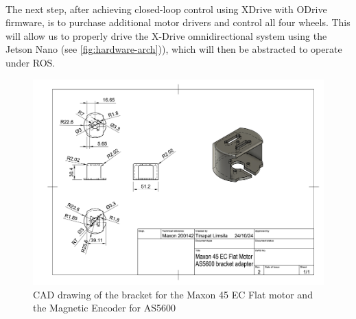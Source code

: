 \paragraph*{}
The next step, after achieving closed-loop control using XDrive with ODrive firmware, is to purchase additional motor drivers and control all four wheels. This will allow us to properly drive the X-Drive omnidirectional system using the Jetson Nano (see \ref{fig:hardware-arch})), which will then be abstracted to operate under ROS.
\begin{figure}
    \centering
    \includegraphics[width=1\linewidth]{assets/images/hardware/Maxon 45 EC Flat Motor AS5600 bracket adapter Drawing v1.png}
    \caption{CAD drawing of the bracket for the Maxon 45 EC Flat motor and the Magnetic Encoder for AS5600}
    \label{fig:real-single-robot}
\end{figure}


